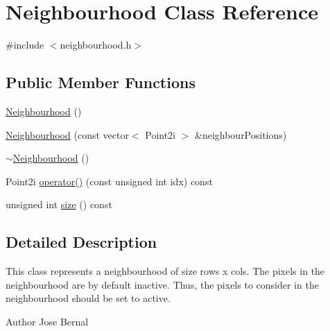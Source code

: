 \hypertarget{classNeighbourhood}{\section{Neighbourhood Class Reference}
\label{classNeighbourhood}
}


{\ttfamily \#include $<$neighbourhood.\-h$>$}

\subsection*{Public Member Functions}
\begin{DoxyCompactItemize}
\item 
\hyperlink{classNeighbourhood_a1fafe62e922347ad822d30f9d861781f}{Neighbourhood} ()
\item 
\hyperlink{classNeighbourhood_af236d52391c0628820fb3cc3fa9eaeaf}{Neighbourhood} (const vector$<$ Point2i $>$ \&neighbour\-Positions)
\item 
\hyperlink{classNeighbourhood_a4df78b0d75b48ed2ed880eb7d68f7a61}{$\sim$\-Neighbourhood} ()
\item 
Point2i \hyperlink{classNeighbourhood_aaa685395d5e4a0783cd7a1a4e8759a60}{operator()} (const unsigned int idx) const 
\item 
unsigned int \hyperlink{classNeighbourhood_a5cdb16c3679f68d4e8de510276be1051}{size} () const 
\end{DoxyCompactItemize}


\subsection{Detailed Description}
This class represents a neighbourhood of size rows x cols. The pixels in the neighbourhood are by default inactive. Thus, the pixels to consider in the neighbourhood should be set to active.

\begin{DoxyAuthor}{Author}
Jose Bernal 
\end{DoxyAuthor}


